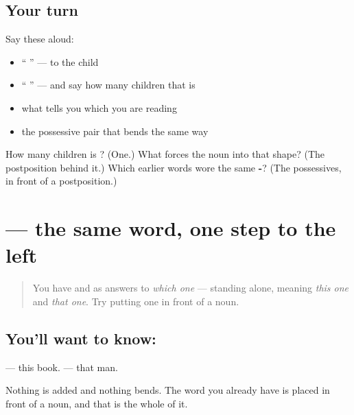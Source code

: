 \subsection*{Your turn}
Say these aloud:

\begin{itemize}
\raggedright
  \item \textquotedblleft{} \textquotedblright{} — to the child
  \item \textquotedblleft{} \textquotedblright{} — and say how many children that is
  \item what tells you which \textbf{} you are reading
  \item the possessive pair that bends the same way
\end{itemize}

\begin{tcolorbox}[breakable,colback=teal!4,colframe=teal!35!black,title={Before you move on}]
How many children is \textbf{ }? (One.) What forces the noun into that shape? (The postposition behind it.) Which earlier words wore the same \textbf{-}? (The possessives, in front of a postposition.)
\end{tcolorbox}
\section[\texorpdfstring{\hi{यह} \hi{किताब} (yah kitāb)}{यह किताब (yah kitāb)}]{  — the same word, one step to the left}

\label{lesson:HI-C91-yah-kitab}



\begin{quote}
You have \textbf{} and \textbf{} as answers to \emph{which one} — standing alone, meaning \emph{this one} and \emph{that one}. Try putting one in front of a noun.
\end{quote}

\subsection*{You'll want to know:  }
\textbf{ } — this book. \textbf{ } — that man.

Nothing is added and nothing bends. The word you already have is placed in front of a noun, and that is the whole of it.

